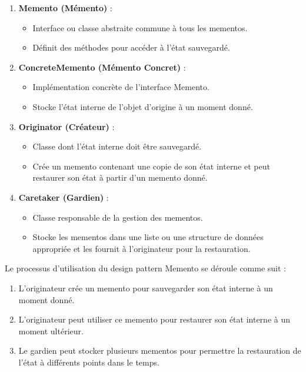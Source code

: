 \begin{enumerate}[leftmargin=*,labelsep=3mm]
    \item \textbf{Memento (Mémento)} :
    \begin{itemize}
        \item Interface ou classe abstraite commune à tous les mementos.
        \item Définit des méthodes pour accéder à l'état sauvegardé.
    \end{itemize}
    
    \item \textbf{ConcreteMemento (Mémento Concret)} :
    \begin{itemize}
        \item Implémentation concrète de l'interface Memento.
        \item Stocke l'état interne de l'objet d'origine à un moment donné.
    \end{itemize}
    
    \item \textbf{Originator (Créateur)} :
    \begin{itemize}
        \item Classe dont l'état interne doit être sauvegardé.
        \item Crée un memento contenant une copie de son état interne et peut restaurer son état à partir d'un memento donné.
    \end{itemize}
    
    \item \textbf{Caretaker (Gardien)} :
    \begin{itemize}
        \item Classe responsable de la gestion des mementos.
        \item Stocke les mementos dans une liste ou une structure de données appropriée et les fournit à l'originateur pour la restauration.
    \end{itemize}
\end{enumerate}

Le processus d'utilisation du design pattern Memento se déroule comme suit :

\begin{enumerate}[leftmargin=*,labelsep=3mm]
    \item L'originateur crée un memento pour sauvegarder son état interne à un moment donné.
    \item L'originateur peut utiliser ce memento pour restaurer son état interne à un moment ultérieur.
    \item Le gardien peut stocker plusieurs mementos pour permettre la restauration de l'état à différents points dans le temps.
\end{enumerate}

